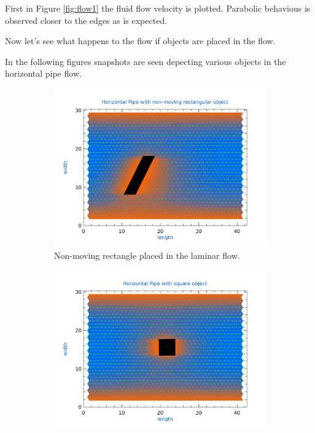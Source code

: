 First in Figure \ref{fig:flow1} the fluid flow velocity is plotted. Parabolic behavious is observed closer to the edges as is expected.

Now let's see what happens to the flow if objects are placed in the flow.

In the following figures snapshots are seen depecting various objects in the horizontal pipe flow.

\begin{figure}[htb]
        \centering
        \begin{subfigure}[b]{0.4\textwidth}
                \centering
                \includegraphics[width=\textwidth]{plots/rectangle.pdf}
                \caption{Non-moving rectangle placed in the laminar flow.}
                \label{fig:rectangle}
        \end{subfigure}
    \quad
        \begin{subfigure}[b]{0.4\textwidth}
                \centering
                \includegraphics[width=\textwidth]{plots/square.pdf}

\end{subfigure}
\end{figure}
